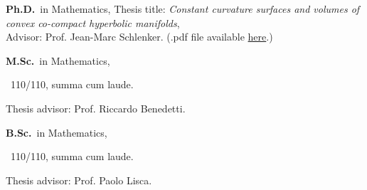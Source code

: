 
	{%
		\textbf{Ph.D.}~in Mathematics,}
	{%
	Thesis title: \emph{Constant curvature surfaces and volumes of convex co-compact hyperbolic manifolds}, \\
	Advisor: Prof. Jean-Marc Schlenker. (.pdf file available \href{https://orbilu.uni.lu/handle/10993/43901}{here}.)}

		{%
			\textbf{M.Sc.}~in Mathematics, \begin{footnotesize}
			~110/110, summa cum laude.
		\end{footnotesize}}
		{Thesis advisor: Prof. Riccardo Benedetti.}

{%
	\textbf{B.Sc.}~in Mathematics, \begin{footnotesize}
	~110/110, summa cum laude.
\end{footnotesize}}{Thesis advisor: Prof. Paolo Lisca.}
